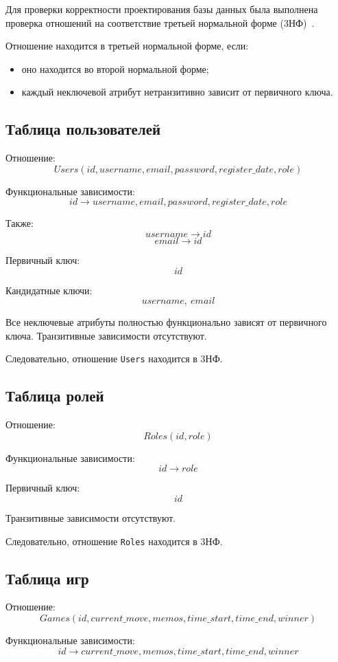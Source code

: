Для проверки корректности проектирования базы данных была выполнена
проверка отношений на соответствие третьей нормальной форме (3НФ)~\cite{date}.

Отношение находится в третьей нормальной форме, если:
\begin{itemize}
    \item оно находится во второй нормальной форме;
    \item каждый неключевой атрибут нетранзитивно зависит от первичного ключа.
\end{itemize}

\subsection{Таблица пользователей}

Отношение:
\[
Users(
id,
username,
email,
password,
register\_date,
role
)
\]

Функциональные зависимости:
\[
id \rightarrow username,
email,
password,
register\_date,
role
\]

Также:
\[
username \rightarrow id
\]
\[
email \rightarrow id
\]

Первичный ключ:
\[
id
\]

Кандидатные ключи:
\[
username,\ email
\]

Все неключевые атрибуты полностью функционально зависят от первичного ключа.
Транзитивные зависимости отсутствуют.

Следовательно, отношение \texttt{Users} находится в 3НФ.

\subsection{Таблица ролей}

Отношение:
\[
Roles(
id,
role
)
\]

Функциональные зависимости:
\[
id \rightarrow role
\]

Первичный ключ:
\[
id
\]

Транзитивные зависимости отсутствуют.

Следовательно, отношение \texttt{Roles} находится в 3НФ.

\subsection{Таблица игр}

Отношение:
\[
Games(
id,
current\_move,
memos,
time\_start,
time\_end,
winner
)
\]

Функциональные зависимости:
\[
id \rightarrow current\_move,
memos,
time\_start,
time\_end,
winner
\]

